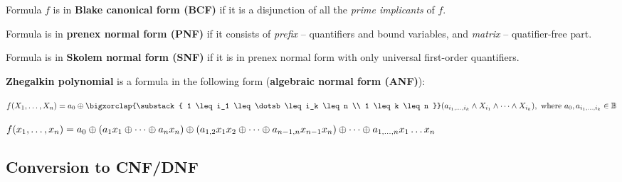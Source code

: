 \documentclass[a4paper,10pt]{article}
\begin{document}
\begin{terms}
\begin{terms}
        \item Formula $f$ is in \textbf{Blake canonical form (BCF)} if it is a disjunction of all the \textit{prime implicants} of $f$.

        \item Formula is in \textbf{prenex normal form (PNF)} if it consists of \textit{prefix} \--- quantifiers and bound variables, and \textit{matrix} \--- quatifier-free part.

        \item Formula is in \textbf{Skolem normal form (SNF)} if it is in prenex normal form with only universal first-order quantifiers.

        \item \textbf{Zhegalkin polynomial} is a formula in the following form (\textbf{algebraic normal form (ANF)}):
        \begin{terms}
            \item \(
                f(X_1, \dotsc, X_n) = a_0 \xor
                \bigxorclap{\substack{
                    1 \leq i_1 \leq \dotsb \leq i_k \leq n \\
                    1 \leq k \leq n }}
                (a_{i_1, \dotsc, i_k} \land X_{i_1} \land \dots \land X_{i_k}),
                \text{ where } a_0, a_{i_1, \dotsc, i_k} \in \Bool
            \)

            \item \(
                f(x_1, \dotsc, x_n) = a_0 \oplus (a_1 x_1 \oplus \dotsb \oplus a_n x_n) \oplus (a_{1,2} x_1 x_2 \oplus \dotsb \oplus a_{n-1,n} x_{n-1} x_n) \oplus \dotsb \oplus a_{1,\dotsc,n} x_1 \dots x_n
            \)
        \end{terms}
    \end{terms}
\end{terms}


\subsection{Conversion to CNF/DNF}
\end{document}
